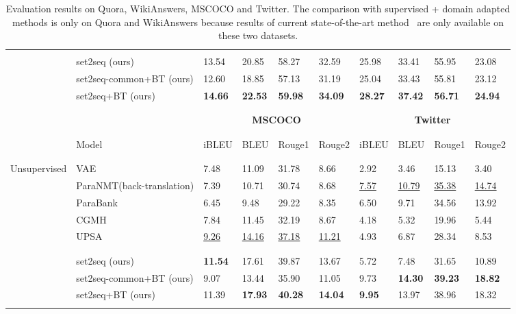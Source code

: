 \begin{table*}[ht]
\begin{tabular}{p{2cm}p{3.4cm}p{0.8cm}<{\centering}p{0.8cm}<{\centering}p{0.8cm}<{\centering}p{0.8cm}<{\centering}p{0.8cm}<{\centering}p{0.8cm}<{\centering}p{0.8cm}<{\centering}p{0.8cm}<{\centering}}
\\ [-1.8ex]
\cline{2-10}
\\ [-1.8ex]
& set2seq \scriptsize{(ours)} & 
13.54 & 20.85 & 58.27 & 32.59 & 25.98 & 33.41 & 55.95 & 23.08 \\
& set2seq-common+BT \scriptsize{(ours)} & 
12.60 & 18.85 & 57.13 & 31.19 & 25.04 & 33.43 & 55.81 & 23.12 \\
& set2seq+BT \scriptsize{(ours)} & 
\textbf{14.66} & \textbf{22.53} & \textbf{59.98} & \textbf{34.09} & \textbf{28.27} & \textbf{37.42} & \textbf{56.71} & \textbf{24.94} \\
\\ [-1.8ex]
\hline
\\ [-1.5ex]
& & \multicolumn{4}{c}{\textbf{MSCOCO}} & \multicolumn{4}{c}{\textbf{Twitter}} \\
\\ [-1.7ex]
\cline{3-6} \cline{7-10} 
\\ [-1.8ex]
 &Model&iBLEU&BLEU&Rouge1&Rouge2&iBLEU&BLEU&Rouge1&Rouge2\\
\\ [-1.8ex]
\hline
\\ [-1.8ex]
\multirow{8}{3cm}{Unsupervised}
& VAE & 
 7.48 & 11.09 & 31.78 &  8.66 &  2.92 &  3.46 & 15.13 &  3.40 \\
& ParaNMT\scriptsize{(back-translation)} & 
 7.39 & 10.71 & 30.74 &  8.68 &  \underline{7.57} & \underline{10.79} & \underline{35.38} & \underline{14.74} \\
& ParaBank & 
 6.45 &  9.48 & 29.22 &  8.35 &  6.50 &  9.71 & 34.56 & 13.92 \\
& CGMH & 
 7.84 & 11.45 & 32.19 &  8.67 &  4.18 &  5.32 & 19.96 &  5.44 \\
& UPSA & 
 \underline{9.26} & \underline{14.16} & \underline{37.18} & \underline{11.21} &  4.93 &  6.87 & 28.34 &  8.53 \\
\\ [-1.8ex]
\cline{2-10}
\\ [-1.8ex]
& set2seq \scriptsize{(ours)} & 
\textbf{11.54} & 17.61 & 39.87 & 13.67 & 5.72 & 7.48 & 31.65 & 10.89 \\
& set2seq-common+BT \scriptsize{(ours)} & 
 9.07 & 13.44 & 35.90 & 11.05 &  9.73 & \textbf{14.30} & \textbf{39.23} & \textbf{18.82} \\
& set2seq+BT \scriptsize{(ours)} & 
11.39 & \textbf{17.93} & \textbf{40.28} & \textbf{14.04} & \textbf{9.95} & 13.97 & 38.96 & 18.32 \\
\\ [-1.8ex]
\hline
\end{tabular}
\caption{\label{tab:result}
Evaluation results on Quora, WikiAnswers, MSCOCO and Twitter. The comparison 
with supervised + domain adapted methods is only on Quora and WikiAnswers 
because results of current state-of-the-art 
method~\citep{li2019decomposable} are only available on these two datasets.
}
\end{table*}

